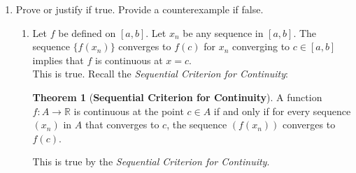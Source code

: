 \documentclass[12pt,letterpaper]{article}
\newcommand{\st}{\ \text{s.t.}\ }
\newcommand{\R}{\mathbb{R}}
\theoremstyle{case}
\newtheorem{case}{Case}
\theoremstyle{definition}
\newtheorem*{theorem*}{Theorem}
\begin{document}
\begin{enumerate}
\begin{enumerate}
\begin{proof}
\begin{case}{$g(0)=1$}
					Let $\varepsilon > 0$ be given, and let $c \in \R$ be arbitrary such that $c \neq 0$. Since $g$ is continuous at 0 and $g(c) \neq 0$, we know that $\exists\ \delta >0 \st \forall\ x \in \R$, we have:
					\[|x-0|<\delta \implies |g(x)-g(0)|<\frac{\varepsilon}{|g(c)|}\]
					that is, since $g(0)=1$, 
					\[|x| < \delta \implies |g(x)-1|<\frac{\varepsilon}{|g(c)|}\]
					Thus, for $x \in \R \st |x-c|<\delta$, we have
					\begin{align*}
						|g(x)-g(c)| &= |g((x-c)+c)-g(c)| \\
						&=|g(x-c)g(c)-g(c)| &(g(a+b)=g(a)g(b)) \\
						&= |g(c)(g(x-c)-1)| \\
						&=|g(c)||g(x-c)-1| \\
						&= |g(c)||g(h)-1| &(\text{Substitue } h:=x-c) \\
						&<|g(c)|\frac{\varepsilon}{|g(c)|} &(|h|=|x-c|<\delta) \\
						&= \varepsilon
					\end{align*}
				\end{case}
				$\therefore$ We have that $g$ is continuous at $c$. Since $c \neq 0$ was arbitrary and $g$ is continuous at 0, we have that $g$ is continuous on $\R$.
			\end{proof}
		\end{enumerate}
	
		\item Prove or justify if true. Provide a counterexample if false.
		\begin{enumerate}
			\item Let $f$ be defined on $[a,b]$. Let $x_n$ be any sequence in $[a,b]$. The sequence $\{f(x_n)\}$ converges to $f(c)$ for $x_n$ converging to $c \in [a,b]$ implies that $f$ is continuous at $x=c$. \\
			
			This is true. Recall the \textit{Sequential Criterion for Continuity}:
			\begin{theorem*}[\textbf{Sequential Criterion for Continuity}]
				A function $f:A \rightarrow \R$ is continuous at the point $c \in A$ if and only if for every sequence $(x_n)$ in $A$ that converges to $c$, the sequence $(f(x_n))$ converges to $f(c)$.
			\end{theorem*}
			This is true by the \textit{Sequential Criterion for Continuity}.\\
			

\end{enumerate}
\end{enumerate}
\end{document}
